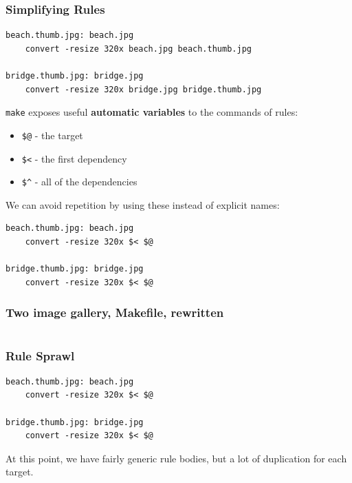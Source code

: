 \documentclass[xcolor=dvipsnames,t,compress]{beamer}
\begin{document}
\begin{frame}[fragile]
\frametitle{Simplifying Rules}
\vspace{-0.75em}
\begin{verbatim}
beach.thumb.jpg: beach.jpg
	convert -resize 320x beach.jpg beach.thumb.jpg

bridge.thumb.jpg: bridge.jpg
	convert -resize 320x bridge.jpg bridge.thumb.jpg
\end{verbatim}
\pause
\texttt{make} exposes useful \textbf{automatic variables} to the commands of rules:
\begin{itemize}
\item \texttt{\$@} - the target
\item \texttt{\$<} - the first dependency
\item \texttt{\$\^} - all of the dependencies
\end{itemize}
\pause
\vspace{0.5em}
We can avoid repetition by using these instead of explicit names:
\begin{verbatim}
beach.thumb.jpg: beach.jpg
	convert -resize 320x $< $@

bridge.thumb.jpg: bridge.jpg
	convert -resize 320x $< $@
\end{verbatim}
\end{frame}

\begin{frame}[fragile]
\frametitle{Two image gallery, Makefile, rewritten}
\vspace{-1em}
\inputminted[frame=single,tabsize=4]{make}{examples/make/Makefile.3}
\end{frame}

\begin{frame}[fragile]
\frametitle{Rule Sprawl}
\vspace{-0.75em}
\begin{verbatim}
beach.thumb.jpg: beach.jpg
	convert -resize 320x $< $@

bridge.thumb.jpg: bridge.jpg
	convert -resize 320x $< $@
\end{verbatim}
At this point, we have fairly generic rule bodies, but a lot of duplication for each target.
\end{frame}
\end{document}
